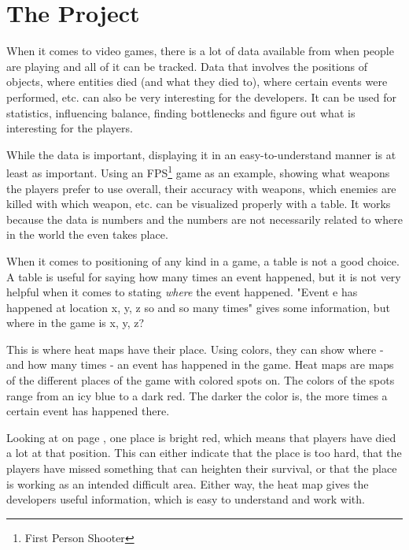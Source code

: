 \section{The Project}
\label{Project}

When it comes to video games, there is a lot of data available from when people are playing and all of it can be tracked. Data that involves the positions of objects, where entities died (and what they died to), where certain events were performed, etc. can also be very interesting for the developers. It can be used for statistics, influencing balance, finding bottlenecks and figure out what is interesting for the players.

While the data is important, displaying it in an easy-to-understand manner is at least as important. Using an FPS\footnote{First Person Shooter} game as an example, showing what weapons the players prefer to use overall, their accuracy with weapons, which enemies are killed with which weapon, etc. can be visualized properly with a table. It works because the data is numbers and the numbers are not necessarily related to where in the world the even takes place.

When it comes to positioning of any kind in a game, a table is not a good choice. A table is useful for saying how many times an event happened, but it is not very helpful when it comes to stating \textit{where} the event happened. "Event e has happened at location x, y, z so and so many times" gives some information, but where in the game is x, y, z?


This is where heat maps have their place. Using colors, they can show where - and how many times - an event has happened in the game. Heat maps are maps of the different places of the game with colored spots on. The colors of the spots range from an icy blue to a dark red. The darker the color is, the more times a certain event has happened there.

Looking at  on page \pageref{fig:HL_2_HeatMap}, one place is bright red, which means that players have died a lot at that position. This can either indicate that the place is too hard, that the players have missed something that can heighten their survival, or that the place is working as an intended difficult area. Either way, the heat map gives the developers useful information, which is easy to understand and work with.


